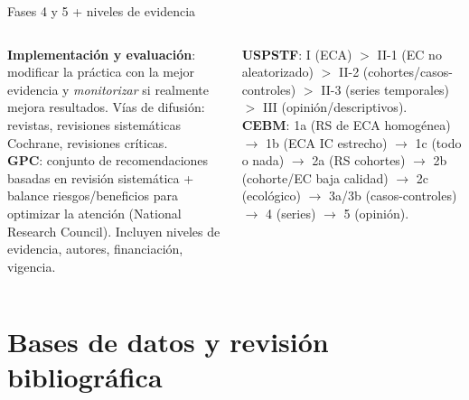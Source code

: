 \documentclass[aspectratio=169,8pt]{beamer}
\begin{document}
\begin{frame}{Fases 4 y 5 + niveles de evidencia}
  \small
  \begin{columns}[T,onlytextwidth]
      \textbf{Implementaci\'on y evaluaci\'on}: modificar la pr\'actica con la mejor evidencia y \emph{monitorizar} si realmente mejora resultados. V\'ias de difusi\'on: revistas, revisiones sistem\'aticas Cochrane, revisiones cr\'iticas.\\[4pt]
      \textbf{GPC}: conjunto de recomendaciones basadas en revisi\'on sistem\'atica + balance riesgos/beneficios para optimizar la atenci\'on (National Research Council). Incluyen niveles de evidencia, autores, financiaci\'on, vigencia.
      \begin{tcolorbox}[formulabox,title=Niveles (resumen)]
        \scriptsize
        \textbf{USPSTF}: I (ECA) $>$ II-1 (EC no aleatorizado) $>$ II-2 (cohortes/casos-controles) $>$ II-3 (series temporales) $>$ III (opini\'on/descriptivos).\\[3pt]
        \textbf{CEBM}: 1a (RS de ECA homog\'enea) $\to$ 1b (ECA IC estrecho) $\to$ 1c (todo o nada) $\to$ 2a (RS cohortes) $\to$ 2b (cohorte/EC baja calidad) $\to$ 2c (ecol\'ogico) $\to$ 3a/3b (casos-controles) $\to$ 4 (series) $\to$ 5 (opini\'on).
      \end{tcolorbox}
  \end{columns}
\end{frame}

\section{Bases de datos y revisi\'on bibliogr\'afica}
\end{document}
